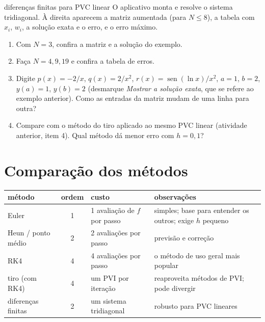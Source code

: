 \begin{atividade}{diferenças finitas para PVC linear}{\arqDifFin}
O aplicativo monta e resolve o sistema tridiagonal. À direita aparecem a matriz aumentada
(para $N\le8$), a tabela com $x_i$, $w_i$, a solução exata e o erro, e o erro máximo.
\begin{enumerate}[nosep]
  \item Com $N=3$, confira a matriz e a solução do exemplo.
  \item Faça $N=4,9,19$ e confira a tabela de erros.
  \item Digite $p(x)=-2/x$, $q(x)=2/x^2$, $r(x)=\operatorname{sen}(\ln x)/x^2$, $a=1$, $b=2$,
        $y(a)=1$, $y(b)=2$ (desmarque \emph{Mostrar a solução exata}, que se refere ao exemplo
        anterior). Como as entradas da matriz mudam de uma linha para outra?
  \item Compare com o método do tiro aplicado ao mesmo PVC linear (atividade anterior, item 4).
        Qual método dá menor erro com $h=0{,}1$?
\end{enumerate}
\end{atividade}

\section{Comparação dos métodos}

\begin{center}
\renewcommand{\arraystretch}{1.4}
\begin{tabular}{l|c|p{3.4cm}|p{5.2cm}}
método & ordem & custo & observações\\ \hline
Euler & 1 & 1 avaliação de $f$ por passo & simples; base para entender os outros; exige $h$ pequeno\\
Heun / ponto médio & 2 & 2 avaliações por passo & previsão e correção\\
RK4 & 4 & 4 avaliações por passo & o método de uso geral mais popular\\
tiro (com RK4) & 4 & um PVI por iteração & reaproveita métodos de PVI; pode divergir\\
diferenças finitas & 2 & um sistema tridiagonal & robusto para PVC lineares
\end{tabular}
\end{center}

